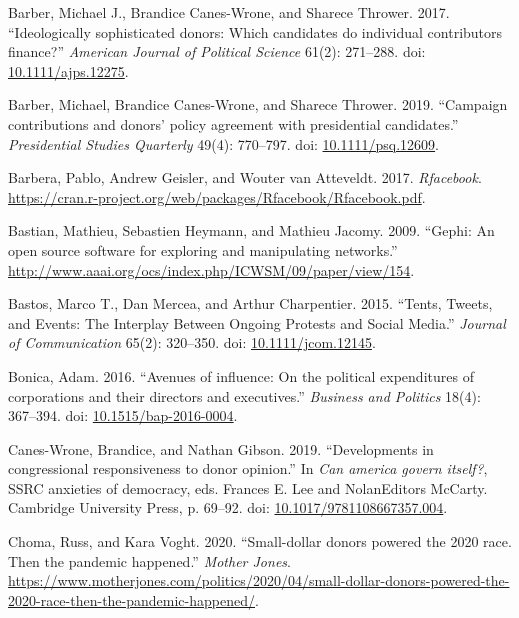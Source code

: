 \documentclass[12pt,]{article}
\newlength{\cslhangindent}
\newenvironment{CSLReferences}%
    {\setlength{\parindent}{0pt}%
    \everypar{\setlength{\hangindent}{\cslhangindent}}\ignorespaces}%
    {\par}
\begin{document}
\begin{CSLReferences}{1}{0}
\leavevmode{}%
Barber, Michael J., Brandice Canes-Wrone, and Sharece Thrower. 2017.
{``Ideologically sophisticated donors: Which candidates do individual
contributors finance?''} \emph{American Journal of Political Science}
61(2): 271--288. doi:
\href{https://doi.org/10.1111/ajps.12275}{10.1111/ajps.12275}.

\leavevmode{}%
Barber, Michael, Brandice Canes-Wrone, and Sharece Thrower. 2019.
{``Campaign contributions and donors' policy agreement with presidential
candidates.''} \emph{Presidential Studies Quarterly} 49(4): 770--797.
doi: \href{https://doi.org/10.1111/psq.12609}{10.1111/psq.12609}.

\leavevmode{}%
Barbera, Pablo, Andrew Geisler, and Wouter van Atteveldt. 2017.
\emph{Rfacebook}.
\url{https://cran.r-project.org/web/packages/Rfacebook/Rfacebook.pdf}.

\leavevmode{}%
Bastian, Mathieu, Sebastien Heymann, and Mathieu Jacomy. 2009. {``Gephi:
An open source software for exploring and manipulating networks.''}
\url{http://www.aaai.org/ocs/index.php/ICWSM/09/paper/view/154}.

\leavevmode{}%
Bastos, Marco T., Dan Mercea, and Arthur Charpentier. 2015. {``{Tents,
Tweets, and Events: The Interplay Between Ongoing Protests and Social
Media}.''} \emph{Journal of Communication} 65(2): 320--350. doi:
\href{https://doi.org/10.1111/jcom.12145}{10.1111/jcom.12145}.

\leavevmode{}%
Bonica, Adam. 2016. {``Avenues of influence: On the political
expenditures of corporations and their directors and executives.''}
\emph{Business and Politics} 18(4): 367--394. doi:
\href{https://doi.org/10.1515/bap-2016-0004}{10.1515/bap-2016-0004}.

\leavevmode{}%
Canes-Wrone, Brandice, and Nathan Gibson. 2019. {``Developments in
congressional responsiveness to donor opinion.''} In \emph{Can america
govern itself?}, SSRC anxieties of democracy, eds. Frances E. Lee and
NolanEditors McCarty. Cambridge University Press, p. 69--92. doi:
\href{https://doi.org/10.1017/9781108667357.004}{10.1017/9781108667357.004}.

\leavevmode{}%
Choma, Russ, and Kara Voght. 2020. {``Small-dollar donors powered the
2020 race. Then the pandemic happened.''} \emph{Mother Jones}.
\url{https://www.motherjones.com/politics/2020/04/small-dollar-donors-powered-the-2020-race-then-the-pandemic-happened/}.


\end{CSLReferences}
\end{document}
